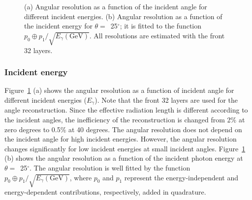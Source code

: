\documentclass[12pt,times,draftclsnofoot,a4paper]{elsarticle}
\begin{document}
\begin{figure}[!hbt]
\centering
{}
\caption{ (a) Angular resolution as a function of the incident angle for different incident energies. (b) Angular resolution as a function of the incident energy for $\theta=$~25$^{\circ}$; it is fitted to the function $p_{0} \oplus p_{1}/\sqrt{E_{\gamma}(\mathrm{GeV})}$. All resolutions are estimated with the front 32 layers. }
\label{fig:angle_reco_dep_gr}
\end{figure}

\subsubsection{Incident energy}
Figure~\ref{fig:angle_reco_dep_gr} (a) shows the angular resolution as a function of incident angle for different incident energies ($E_{\gamma}$). Note that the front 32 layers are used for the angle reconstruction. Since the effective radiation length is different according to the incident angles, the inefficiency of the reconstruction is changed from 2\% at zero degrees to 0.5\% at 40 degrees. The angular resolution does not depend on the incident angle for high incident energies. However, the angular resolution changes significantly for low incident energies at small incident angles. Figure~\ref{fig:angle_reco_dep_gr} (b) shows the angular resolution as a function of the incident photon energy at $\theta=$~25$^{\circ}$. The angular resolution is well fitted by the function $p_{0} \oplus p_{1}/\sqrt{E_{\gamma}(\mathrm{GeV})}$, where $p_{0}$ and $p_{1}$ represent the energy-independent and energy-dependent contributions, respectively, added in quadrature.
\end{document}
